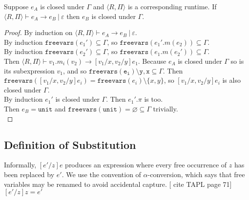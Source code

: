 \documentclass[a4paper,UKenglish]{lipics-v2016}
\newcommand{\kwa}[1]{\mathtt{ #1 }}
\newcommand{\rctx}[0]{ \langle R, \Pi \rangle }
\begin{document}
\begin{lemma}[Closedness]
Suppose $e_A$ is closed under $\Gamma$ and $\rctx$ is a corresponding runtime. If $\rctx \vdash e_A \longrightarrow e_B~|~\varepsilon$ then $e_B$ is closed under $\Gamma$.
\end{lemma}

\begin{proof}
By induction on $\rctx \vdash e_A \longrightarrow e_B~|~\varepsilon$. \\

\noindent
{} By induction $\kwa{freevars}(e_1') \subseteq \Gamma$, so $\kwa{freevars}(e_1'.m(e_2)) \subseteq \Gamma$. \\

\noindent
{} By induction $\kwa{freevars}(e_2') \subseteq \Gamma$, so $\kwa{freevars}(e_1.m(e_2')) \subseteq \Gamma$. \\

\noindent
{} Then $\rctx \vdash v_1.m_i(v_2) \longrightarrow [v_1/x, v_2/y]e_1$. Because $e_A$ is closed under $\Gamma$ so is its subexpression $v_1$, and so $\kwa{freevars(e_i) \setminus {y,x}} \subseteq \Gamma$. Then $\kwa{freevars}([v_1/x, v_2/y]e_i) = \kwa{freevars}(e_i) \setminus \{ x,y \}$, so $[v_1/x, v_2/y]e_i$ is also closed under $\Gamma$. \\

\noindent
{} By induction $e_1'$ is closed under $\Gamma$. Then $e_1'.\pi$ is too.  \\

\noindent
{} Then $e_B = \kwa{unit}$ and $\kwa{freevars}(\kwa{unit}) = \varnothing \subseteq \Gamma$ trivially. \\

\end{proof}

\subsection{Definition of Substitution}

Informally, $[e'/z]e$ produces an expression where every free occurrence of $z$ has been replaced by $e'$. We use the convention of $\alpha$-conversion, which says that free variables may be renamed to avoid accidental capture. [ cite TAPL page 71] \\

$[e'/z]z = e'$
\end{document}
